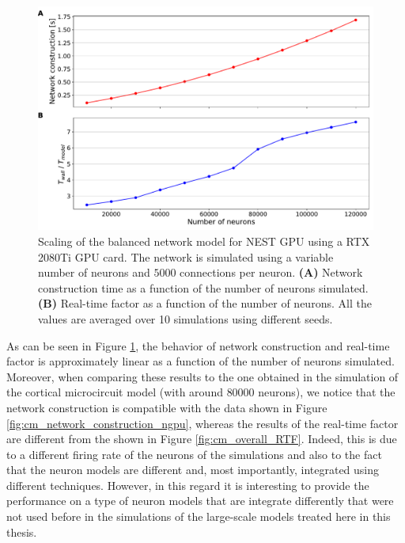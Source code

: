\documentclass[a4paper, 12pt, twoside, openright]{book}
\begin{document}
\begin{figure}[H]
    \centering
    \includegraphics[width=0.9\columnwidth]{figures/weak_scaling.pdf}
    \caption{Scaling of the balanced network model for NEST GPU using a RTX 2080Ti GPU card. The network is simulated using a variable number of neurons and $5000$ connections per neuron. \textbf{(A)} Network construction time as a function of the number of neurons simulated. \textbf{(B)} Real-time factor as a function of the number of neurons. All the values are averaged over 10 simulations using different seeds.}
    \label{fig:weak_scaling}
\end{figure}

As can be seen in Figure \ref{fig:weak_scaling}, the behavior of network construction and real-time factor is approximately linear as a function of the number of neurons simulated. Moreover, when comparing these results to the one obtained in the simulation of the cortical microcircuit model (with around $80000$ neurons), we notice that the network construction is compatible with the data shown in Figure \ref{fig:cm_network_construction_ngpu}, whereas the results of the real-time factor are different from the shown in Figure \ref{fig:cm_overall_RTF}. Indeed, this is due to a different firing rate of the neurons of the simulations and also to the fact that the neuron models are different and, most importantly, integrated using different techniques. However, in this regard it is interesting to provide the performance on a type of neuron models that are integrate differently that were not used before in the simulations of the large-scale models treated here in this thesis.








\end{document}

